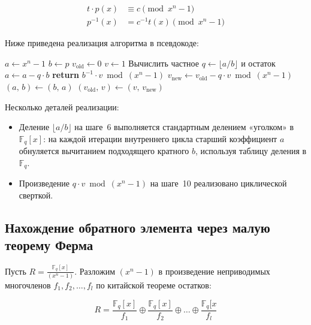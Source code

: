 \documentclass[14pt]{mmcs_article}
\theoremstyle{break}
\begin{document}
\begin{align}
    t \cdot p(x) &\equiv c \pmod{x^n - 1} \\
    p^{-1}(x) &= c^{-1} t(x) \pmod{x^n - 1}
\end{align}

Ниже приведена реализация алгоритма в псевдокоде:

\begin{algorithm}
\caption{Расширенный алгоритм Евклида для нахождения $p^{-1}$, $p \in \mathbb{F}_q[x]/(x^n-1)$}
\begin{algorithmic}[1]
\State $a \leftarrow x^n - 1$
\State $b \leftarrow p$
\State $v_{\mathrm{old}} \leftarrow 0$
\State $v \leftarrow 1$
\Loop
    \State Вычислить частное $q \leftarrow \lfloor a / b \rfloor$ и остаток $a \leftarrow a - q \cdot b$
        \State \textbf{return} $b^{-1} \cdot v \bmod (x^n - 1)$
    \EndIf
    \State $v_{\mathrm{new}} \leftarrow v_{\mathrm{old}} - q \cdot v \bmod (x^n - 1)$
    \State $(a,\, b) \leftarrow (b,\, a)$
    \State $(v_{\mathrm{old}},\, v) \leftarrow (v,\, v_{\mathrm{new}})$
\EndLoop
\end{algorithmic}
\end{algorithm}

\noindent Несколько деталей реализации:
\begin{itemize}
    \item Деление $\lfloor a / b \rfloor$ на шаге~6 выполняется стандартным делением «уголком» в $\mathbb{F}_q[x]$: на каждой итерации внутреннего цикла старший коэффициент $a$ обнуляется вычитанием подходящего кратного $b$, используя таблицу деления в $\mathbb{F}_q$.
    \item Произведение $q \cdot v \bmod (x^n-1)$ на шаге~10 реализовано циклической сверткой.
\end{itemize}

\subsection{Нахождение обратного элемента через малую теорему Ферма}

Пусть $R = \frac{\mathbb{F}_q[x]}{(x^n - 1)}$. Разложим $(x^n - 1)$ в произведение неприводимых многочленов $f_1, f_2, \ldots, f_l$ по китайской теореме остатков:

\begin{equation}
    R = \frac{\mathbb{F}_q[x]}{f_1} \oplus \frac{\mathbb{F}_q[x]}{f_2} \oplus \ldots \oplus \frac{\mathbb{F}_q[x}{f_l}
\end{equation}
\end{document}
